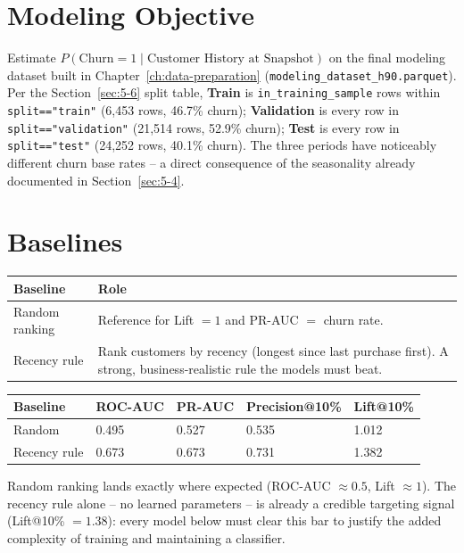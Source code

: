 \section{Modeling Objective}
\label{sec:6-1}

Estimate $P(\text{Churn} = 1 \mid \text{Customer History at Snapshot})$ on the final modeling dataset built in Chapter~\ref{ch:data-preparation} (\texttt{modeling\_dataset\_h90.parquet}). Per the Section~\ref{sec:5-6} split table, \textbf{Train} is \texttt{in\_training\_sample} rows within \texttt{split=="train"} (6,453 rows, 46.7\% churn); \textbf{Validation} is every row in \texttt{split=="validation"} (21,514 rows, 52.9\% churn); \textbf{Test} is every row in \texttt{split=="test"} (24,252 rows, 40.1\% churn). The three periods have noticeably different churn base rates -- a direct consequence of the seasonality already documented in Section~\ref{sec:5-4}.

\section{Baselines}
\label{sec:6-2}

\begin{center}
\begin{tabular}{@{}p{4.2cm}p{9.9cm}@{}}
    \toprule
    Baseline & Role \\
    \midrule
    Random ranking & Reference for Lift $= 1$ and PR-AUC $=$ churn rate. \\
    Recency rule & Rank customers by recency (longest since last purchase first). A strong, business-realistic rule the models must beat. \\
    \bottomrule
\end{tabular}
\end{center}

\begin{center}
\begin{tabular}{@{}p{3.2cm}p{1.8cm}p{1.8cm}p{2.4cm}p{1.8cm}@{}}
    \toprule
    Baseline & ROC-AUC & PR-AUC & Precision@10\% & Lift@10\% \\
    \midrule
    Random & 0.495 & 0.527 & 0.535 & 1.012 \\
    Recency rule & 0.673 & 0.673 & 0.731 & 1.382 \\
    \bottomrule
\end{tabular}
\end{center}

Random ranking lands exactly where expected (ROC-AUC $\approx 0.5$, Lift $\approx 1$). The recency rule alone -- no learned parameters -- is already a credible targeting signal (Lift@10\% $= 1.38$): every model below must clear this bar to justify the added complexity of training and maintaining a classifier.

